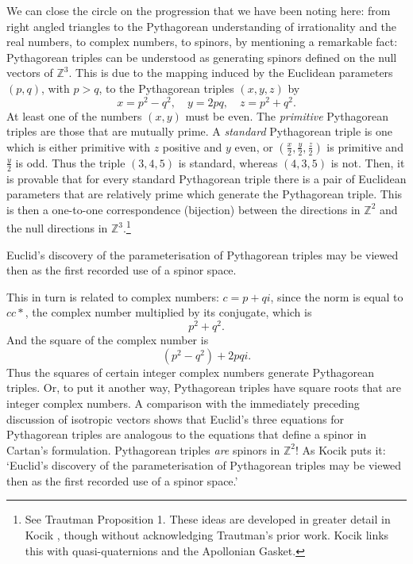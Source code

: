 \documentclass[11pt,oneside,a4paper]{article}
\begin{document}
We can close the circle on the progression that we have been noting here: from right angled triangles to the Pythagorean understanding of irrationality and the real numbers, to complex numbers, to spinors, by mentioning a remarkable fact: Pythagorean triples can be understood as generating spinors defined on the null vectors of $\mathbb{Z}^{3}$. This is due to the mapping induced by the Euclidean parameters $(p, q)$, with $p > q$, to the Pythagorean triples $(x, y, z)$ by
$$ x = p^{2} - q^{2}, \quad y = 2pq,\quad z = p^{2} + q^{2}.$$
At least one of the numbers $(x, y)$ must be even. The \textit{primitive} Pythagorean triples are those that are mutually prime. A \textit{standard} Pythagorean triple is one which is either primitive with $z$ positive and $y$ even, or $(\frac{x}{2}, \frac{y}{2}, \frac{z}{2})$ is primitive and $\frac{y}{2}$ is odd. Thus the triple $(3, 4, 5)$ is standard, whereas $(4, 3, 5)$ is not. Then, it is provable that for every standard Pythagorean triple there is a pair of Euclidean parameters that are relatively prime which generate the Pythagorean triple. This is then a one-to-one correspondence (bijection) between the directions in $\mathbb{Z}^{2}$ and the null directions in $\mathbb{Z}^{3}$.\footnote{See Trautman \parencite*{trautman_pythagorean_1998} Proposition 1. These ideas are developed in greater detail in Kocik \parencite*{kocik_clifford_2007}, though without acknowledging Trautman's prior work. Kocik links this with quasi-quaternions and the Apollonian Gasket.}

Euclid's discovery of the parameterisation of Pythagorean triples may be viewed then as the first recorded use of a spinor space.

This in turn is related to complex numbers: $c = p + qi$, since the norm is equal to $cc*$, the complex number multiplied by its conjugate, which is $$p^{2} + q^{2}.$$ And the square of the complex number is 
\[ (p^{2} - q^{2}) + 2pqi.\]
Thus the squares of certain integer complex numbers generate Pythagorean triples. Or, to put it another way, Pythagorean triples have square roots that are integer complex numbers. A comparison with the immediately preceding discussion of isotropic vectors shows that Euclid's three equations for Pythagorean triples are analogous to the equations that define a spinor in Cartan's formulation. Pythagorean triples \textit{are} spinors in $\mathbb{Z}^{2}$! As Kocik \parencite*{kocik_clifford_2007} puts it: `Euclid's discovery of the parameterisation of Pythagorean triples may be viewed then as the first recorded use of a spinor space.'
\end{document}
